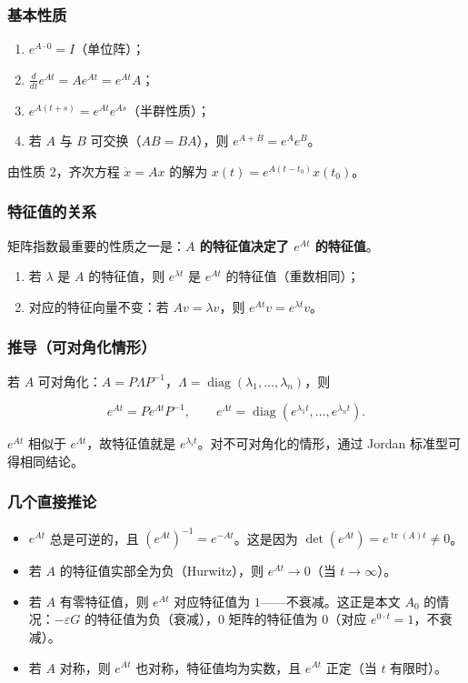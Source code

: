 \documentclass[UTF8,fontset=fandol]{ctexart}
\begin{document}
\subsubsection*{基本性质}

\begin{enumerate}
  \item $e^{A \cdot 0} = I$（单位阵）；
  \item $\displaystyle \frac{d}{dt} e^{At} = A e^{At} = e^{At} A$；
  \item $e^{A(t+s)} = e^{At} e^{As}$（半群性质）；
  \item 若 $A$ 与 $B$ 可交换（$AB=BA$），则 $e^{A+B} = e^A e^B$。
\end{enumerate}

由性质 2，齐次方程 $\dot{x} = Ax$ 的解为 $x(t) = e^{A(t-t_0)} x(t_0)$。

\subsubsection*{特征值的关系}

矩阵指数最重要的性质之一是：\textbf{$A$ 的特征值决定了 $e^{At}$ 的特征值}。

\begin{enumerate}
  \item 若 $\lambda$ 是 $A$ 的特征值，则 $e^{\lambda t}$ 是 $e^{At}$ 的特征值（重数相同）；
  \item 对应的特征向量不变：若 $A v = \lambda v$，则 $e^{At} v = e^{\lambda t} v$。
\end{enumerate}

\subsubsection*{推导（可对角化情形）}

若 $A$ 可对角化：$A = P \Lambda P^{-1}$，$\Lambda = \operatorname{diag}(\lambda_1,\dots,\lambda_n)$，则

\[
e^{At} = P e^{\Lambda t} P^{-1}, \qquad
e^{\Lambda t} = \operatorname{diag}(e^{\lambda_1 t}, \dots, e^{\lambda_n t}).
\]

$e^{At}$ 相似于 $e^{\Lambda t}$，故特征值就是 $e^{\lambda_i t}$。对不可对角化的情形，通过 Jordan 标准型可得相同结论。

\subsubsection*{几个直接推论}

\begin{itemize}
  \item $e^{At}$ 总是可逆的，且 $(e^{At})^{-1} = e^{-At}$。这是因为 $\det(e^{At}) = e^{\operatorname{tr}(A)t} \neq 0$。
  \item 若 $A$ 的特征值实部全为负（Hurwitz），则 $e^{At} \to 0$（当 $t \to \infty$）。
  \item 若 $A$ 有零特征值，则 $e^{At}$ 对应特征值为 $1$——不衰减。这正是本文 $A_0$ 的情况：$-\varepsilon G$ 的特征值为负（衰减），$0$ 矩阵的特征值为 $0$（对应 $e^{0\cdot t}=1$，不衰减）。
  \item 若 $A$ 对称，则 $e^{At}$ 也对称，特征值均为实数，且 $e^{At}$ 正定（当 $t$ 有限时）。
\end{itemize}
\end{document}
